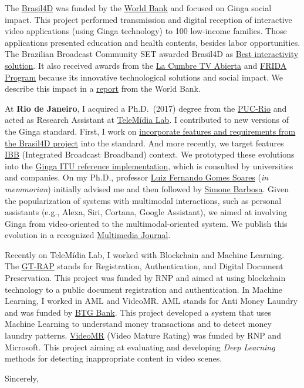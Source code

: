 \documentclass[10pt,a4paper,sans,colorlinks]{moderncv}
\begin{document}
The \href{http://www.ebc.com.br/brasil-4d}{Brasil4D} was funded by the \href{https://www.worldbank.org/}{World Bank} and focused on Ginga social impact.
This project performed transmission and digital reception of interactive video applications (using Ginga technology) to 100 low-income families.
Those applications presented education and health contents, besides labor opportunities.
The Brazilian Broadcast Community SET awarded Brasil4D as \href{http://set.org.br/artigos/ed137/137_revistadaset_70.pdf}{Best interactivity solution}.
It also received awards from the \href{https://www.premiotv.com/es/ganadores-es/ganadores-2013-es}{La Cumbre TV Abierta} and \href{https://programafrida.net/archivos/project/brasil-4d}{FRIDA Program} because its innovative technological solutions and social impact.
We describe this impact in a  \href{http://documents.worldbank.org/curated/en/232621468230956108/pdf/809560WP0PORTU0Box0379824B00PUBLIC0.pdf}{report} from the World Bank.

At \textbf{Rio de Janeiro}, I acquired a Ph.D.~(2017) degree from the \href{http://www.inf.puc-rio.br/}{PUC-Rio} and acted as Research Assistant at \href{http://telemidia.puc-rio.br/}{TeleMídia Lab}.
I contributed to new versions of the Ginga standard.
First, I work on \href{https://www.abntcatalogo.com.br/norma.aspx?
  ID=361857#}{incorporate features and requirements from the Brasil4D project} into the standard.
And more recently, we target features \href{http://www.freepatentsonline.com/y2016/0234533.html}{IBB} (Integrated Broadcast Broadband) context.
We prototyped these evolutions into the  \href{https://github.com/TeleMidia/ginga}{Ginga ITU reference implementation}, which is consulted by universities and companies.
On my Ph.D., professor \href{https://www.researchgate.net/profile/Luiz_Fernando_Soares}{Luiz Fernando Gomes Soares} (\textit{in memmorian}) initially advised me and then followed by  \href{https://www.linkedin.com/in/simonedjb/}{Simone Barbosa}.
Given the popularization of systems with multimodal interactions, such as personal assistants (e.g., Alexa, Siri, Cortana, Google Assistant), we aimed at involving Ginga from video-oriented to the multimodal-oriented system.
We publish this evolution in a recognized \href{https://link.springer.com/article/10.1007\%2Fs11042-016-3846-8}{Multimedia Journal}.

Recently on TeleMídia Lab, I worked with Blockchain and Machine Learning.
The \href{http://wrnp.rnp.br/sites/wrnp2017/files/02_wrnp2017_poster_gt-sap_design.pdf}{GT-RAP} stands for Registration, Authentication, and Digital Document Preservation.
This project was funded by RNP and aimed at using blockchain technology to a public document registration and authentication.
In Machine Learning, I worked in AML and VideoMR.
AML stands for Anti Money Laundry and was funded by \href{https://www.btgpactual.com/}{BTG
Bank}.
This project developed a system that uses Machine Learning to understand money transactions and to detect money laundry patterns.
\href{https://www.rnp.br/en/rnp-and-microsoft-challenge-artificial-intelligence}{VideoMR} (Video Mature Rating) was funded by RNP and Microsoft.
This project aiming at evaluating and developing \textit{Deep Learning} methods for detecting inappropriate content in video scenes.

\vspace{1em}
\raggedright
Sincerely, \myname
\end{document}
